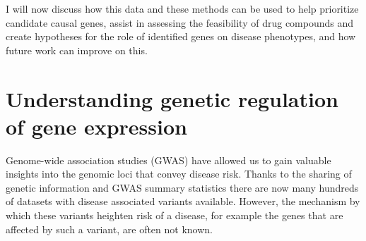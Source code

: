 I will now discuss how this data and these methods can be used to help prioritize candidate causal genes, assist in assessing the feasibility of drug compounds and create hypotheses for the role of identified genes on disease phenotypes, and how future work can improve on this.

\section{Understanding genetic regulation of gene expression}
Genome-wide association studies (GWAS) have allowed us to gain valuable insights into the genomic loci that convey disease risk.  Thanks to the sharing of genetic information and GWAS summary statistics there are now many hundreds of datasets with disease associated variants available\cite{visscher10YearsGWAS2017}. However, the mechanism by which these variants heighten risk of a disease, for example the genes that are affected by such a variant, are often not known. 

